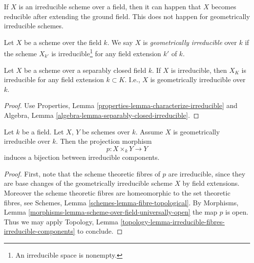 \noindent
If $X$ is an irreducible scheme over a field, then it can happen that $X$
becomes reducible after extending the ground field. This does not happen
for geometrically irreducible schemes.

\begin{definition}
\label{definition-geometrically-irreducible}
Let $X$ be a scheme over the field $k$.
We say $X$ is {\it geometrically irreducible} over $k$ if the scheme
$X_{k'}$ is irreducible\footnote{An irreducible space is nonempty.}
for any field extension $k'$ of $k$.
\end{definition}

\begin{lemma}
\label{lemma-separably-closed-irreducible}
Let $X$ be a scheme over a separably closed field $k$.
If $X$ is irreducible, then $X_K$ is irreducible for any
field extension $k \subset K$. I.e., $X$ is geometrically
irreducible over $k$.
\end{lemma}

\begin{proof}
Use Properties, Lemma \ref{properties-lemma-characterize-irreducible}
and Algebra, Lemma \ref{algebra-lemma-separably-closed-irreducible}.
\end{proof}

\begin{lemma}
\label{lemma-bijection-irreducible-components}
Let $k$ be a field.
Let $X$, $Y$ be schemes over $k$.
Assume $X$ is geometrically irreducible over $k$.
Then the projection morphism
$$
p : X \times_k Y \longrightarrow Y
$$
induces a bijection between irreducible components.
\end{lemma}

\begin{proof}
First, note that the scheme theoretic fibres of $p$ are irreducible,
since they are base changes of the geometrically irreducible scheme $X$
by field extensions. Moreover the scheme theoretic fibres are
homeomorphic to the set theoretic fibres, see
Schemes, Lemma \ref{schemes-lemma-fibre-topological}.
By Morphisms, Lemma \ref{morphisms-lemma-scheme-over-field-universally-open}
the map $p$ is open.
Thus we may apply Topology,
Lemma \ref{topology-lemma-irreducible-fibres-irreducible-components}
to conclude.
\end{proof}

